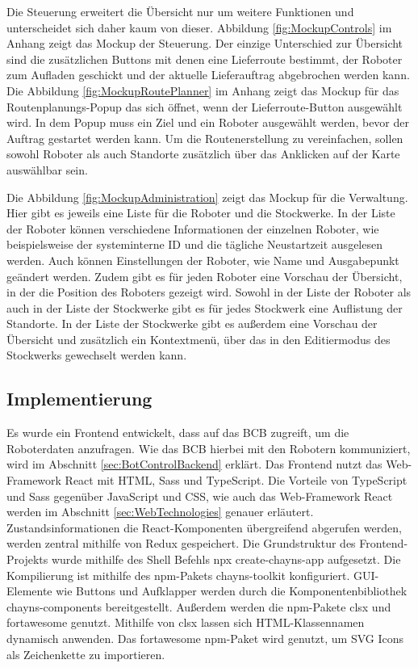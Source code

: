 Die Steuerung erweitert die Übersicht nur um weitere Funktionen und unterscheidet sich daher kaum von dieser. Abbildung \ref{fig:MockupControls} im Anhang zeigt das \gls{Mockup} der Steuerung. Der einzige Unterschied zur Übersicht sind die zusätzlichen Buttons mit denen eine Lieferroute bestimmt, der Roboter zum Aufladen geschickt und der aktuelle Lieferauftrag abgebrochen werden kann. Die Abbildung \ref{fig:MockupRoutePlanner} im Anhang zeigt das \gls{Mockup} für das Routenplanungs-Popup das sich öffnet, wenn der Lieferroute-Button ausgewählt wird. In dem Popup muss ein Ziel und ein Roboter ausgewählt werden, bevor der Auftrag gestartet werden kann. Um die Routenerstellung zu vereinfachen, sollen sowohl Roboter als auch Standorte zusätzlich über das Anklicken auf der Karte auswählbar sein.

Die Abbildung \ref{fig:MockupAdministration} zeigt das \gls{Mockup} für die Verwaltung. Hier gibt es jeweils eine Liste für die Roboter und die Stockwerke. In der Liste der Roboter können verschiedene Informationen der einzelnen Roboter, wie beispielsweise der systeminterne \ac{ID} und die tägliche Neustartzeit ausgelesen werden. Auch können Einstellungen der Roboter, wie Name und Ausgabepunkt geändert werden. Zudem gibt es für jeden Roboter eine Vorschau der Übersicht, in der die Position des Roboters gezeigt wird. Sowohl in der Liste der Roboter als auch in der Liste der Stockwerke gibt es für jedes Stockwerk eine Auflistung der Standorte. In der Liste der Stockwerke gibt es außerdem eine Vorschau der Übersicht und zusätzlich ein Kontextmenü, über das in den Editiermodus des Stockwerks gewechselt werden kann.

\subsection{Implementierung}
Es wurde ein Frontend entwickelt, dass auf das \ac{BCB} zugreift, um die Roboterdaten anzufragen. Wie das \ac{BCB} hierbei mit den Robotern kommuniziert, wird im Abschnitt \ref{sec:BotControlBackend} erklärt. Das Frontend nutzt das Web-Framework React mit \ac{HTML}, \ac{Sass} und TypeScript. Die Vorteile von TypeScript und \ac{Sass} gegenüber JavaScript und \ac{CSS}, wie auch das Web-Framework React werden im Abschnitt \ref{sec:WebTechnologies} genauer erläutert. Zustandsinformationen die React-Komponenten übergreifend abgerufen werden, werden zentral mithilfe von Redux gespeichert. Die Grundstruktur des Frontend-Projekts wurde mithilfe des Shell Befehls npx create-chayns-app \cite{CreateChaynsApp} aufgesetzt. Die Kompilierung ist mithilfe des \ac{npm}-Pakets chayns-toolkit \cite{ChaynsToolkit} konfiguriert. \ac{GUI}-Elemente wie Buttons und Aufklapper werden durch die Komponentenbibliothek chayns-components \cite{ChaynsComponents} bereitgestellt. Außerdem werden die \ac{npm}-Pakete clsx \cite{clsx} und fortawesome \cite{fontawesome} genutzt. Mithilfe von clsx lassen sich \ac{HTML}-Klassennamen dynamisch anwenden. Das fortawesome \ac{npm}-Paket wird genutzt, um \ac{SVG} Icons als Zeichenkette zu importieren.

